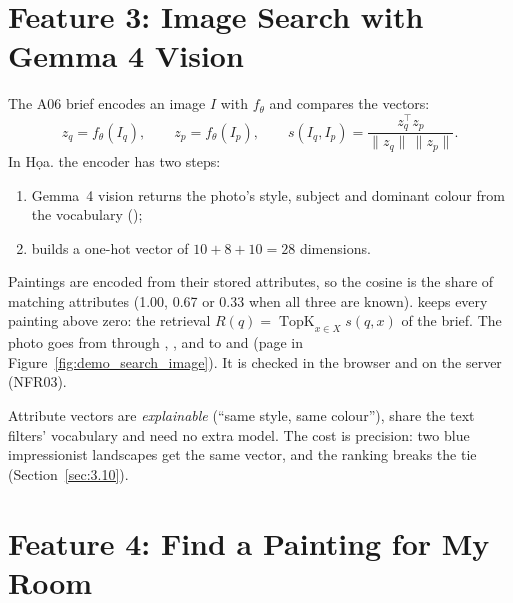 \section{Feature 3: Image Search with Gemma 4 Vision}\label{sec:3.7}

The A06 brief encodes an image $I$ with $f_\theta$ and compares the vectors:
\begin{equation}
z_q = f_\theta(I_q), \qquad z_p = f_\theta(I_p), \qquad
s(I_q, I_p) = \frac{z_q^{\top} z_p}{\lVert z_q\rVert\,\lVert z_p\rVert}.
\label{eq:cosine}
\end{equation}
In Họa. the encoder has two steps:
\begin{enumerate}
\item Gemma~4 vision returns the photo's style, subject and dominant colour from the vocabulary
      ();
\item {} builds a one-hot vector of $10+8+10 = 28$ dimensions.
\end{enumerate}
Paintings are encoded from their stored attributes, so the cosine is the share of matching attributes (1.00, 0.67 or
0.33 when all three are known).  keeps every painting above zero: the retrieval
$R(q) = \operatorname{TopK}_{x\in X} s(q, x)$ of the brief. The photo goes from  through
, ,  and  to  and
 (page in Figure~\ref{fig:demo_search_image}). It is checked in the browser and on the server
(NFR03).

Attribute vectors are \emph{explainable} (``same style, same colour''), share the text filters' vocabulary and need
no extra model. The cost is precision: two blue impressionist landscapes get the same vector, and the ranking breaks
the tie (Section~\ref{sec:3.10}).

\section{Feature 4: Find a Painting for My Room}\label{sec:3.8}

